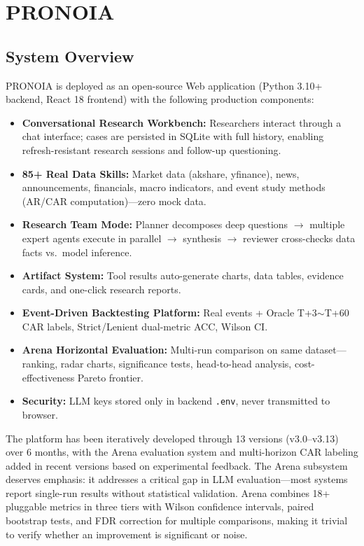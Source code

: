\documentclass[sigconf, anonymous, review]{acmart}
\begin{document}
\section{PRONOIA}

\subsection{System Overview}

PRONOIA is deployed as an open-source Web application (Python 3.10+ backend, React 18 frontend) with the following production components:

\begin{itemize}
    \item \textbf{Conversational Research Workbench:} Researchers interact through a chat interface; cases are persisted in SQLite with full history, enabling refresh-resistant research sessions and follow-up questioning.
    \item \textbf{85+ Real Data Skills:} Market data (akshare, yfinance), news, announcements, financials, macro indicators, and event study methods (AR/CAR computation)---zero mock data.
    \item \textbf{Research Team Mode:} Planner decomposes deep questions $\to$ multiple expert agents execute in parallel $\to$ synthesis $\to$ reviewer cross-checks data facts vs.\ model inference.
    \item \textbf{Artifact System:} Tool results auto-generate charts, data tables, evidence cards, and one-click research reports.
    \item \textbf{Event-Driven Backtesting Platform:} Real events + Oracle T+3$\sim$T+60 CAR labels, Strict/Lenient dual-metric ACC, Wilson CI.
    \item \textbf{Arena Horizontal Evaluation:} Multi-run comparison on same dataset---ranking, radar charts, significance tests, head-to-head analysis, cost-effectiveness Pareto frontier.
    \item \textbf{Security:} LLM keys stored only in backend \texttt{.env}, never transmitted to browser.
\end{itemize}

The platform has been iteratively developed through 13 versions (v3.0--v3.13) over 6 months, with the Arena evaluation system and multi-horizon CAR labeling added in recent versions based on experimental feedback. The Arena subsystem deserves emphasis: it addresses a critical gap in LLM evaluation---most systems report single-run results without statistical validation. Arena combines 18+ pluggable metrics in three tiers with Wilson confidence intervals, paired bootstrap tests, and FDR correction for multiple comparisons, making it trivial to verify whether an improvement is significant or noise.
\end{document}

